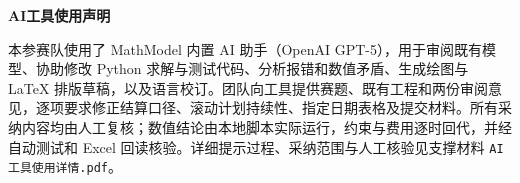 {}
\begin{center}
	{\bfseries AI工具使用声明}
\end{center}

本参赛队使用了 MathModel 内置 AI 助手（OpenAI GPT-5），用于审阅既有模型、协助修改 Python 求解与测试代码、分析报错和数值矛盾、生成绘图与 LaTeX 排版草稿，以及语言校订。团队向工具提供赛题、既有工程和两份审阅意见，逐项要求修正结算口径、滚动计划持续性、指定日期表格及提交材料。所有采纳内容均由人工复核；数值结论由本地脚本实际运行，约束与费用逐时回代，并经自动测试和 Excel 回读核验。详细提示过程、采纳范围与人工核验见支撑材料 \texttt{AI工具使用详情.pdf}。
